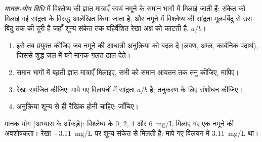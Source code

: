 \begin{definition}[मानक योग]\label{def:b2:measurement-statistics:standard-addition}
\emph{मानक-योग विधि} में विश्लेष्य की ज्ञात मात्राएँ
स्वयं नमूने के समान भागों में मिलाई जाती हैं; संकेत को मिलाई गई सांद्रता के विरुद्ध आलेखित किया जाता है,
और नमूने में विश्लेष्य की सांद्रता मूल-बिंदु से उस बिंदु तक की दूरी है जहाँ
शून्य संकेत तक बहिर्वेशित रेखा अक्ष को काटती है, $a/b$।
\end{definition}

\begin{method}[मानक योग]\label{met:b2:measurement-statistics:standard-addition}
\begin{enumerate}
  \item इसे तब प्रयुक्त कीजिए जब नमूने की आधात्री अनुक्रिया को बदल दे (लवण, अम्ल, कार्बनिक पदार्थ), जिससे
        शुद्ध जल में बने मानक ग़लत ढाल देते।
  \item समान भागों में बढ़ती ज्ञात मात्राएँ मिलाइए, सभी को समान आयतन तक तनु कीजिए, मापिए।
  \item रेखा समंजित कीजिए; मापे गए विलयनों में सांद्रता $a/b$ है; तनुकरण के लिए संशोधन कीजिए।
  \item अनुक्रिया शून्य से ही रैखिक होनी चाहिए:  जाँचिए।
\end{enumerate}
\end{method}

\begin{omfigure}

{\small मानक योग (अभ्यास के आँकड़े): विश्लेष्य के 0, 2, 4 और
\qty{6}{mg/L} मिलाए गए एक नमूने की अवशोषकता। रेखा \qty{-3.11}{mg/L} पर शून्य संकेत से मिलती है: मापे गए विलयन में
\qty{3.11}{mg/L} था।}
\end{omfigure}


